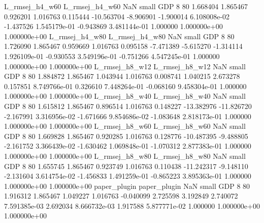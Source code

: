 L_rmsej_h4_w60 L_rmsej_h4_w60                   NaN      small      GDP                 8 80 1.668404       1.865467 0.926201       1.016763    0.115444    -10.563704     -8.906901    -1.900014   6.108008e-02 -1.437526 1.545179e-01    -0.943869   3.481144e-01            1.000000    1.000000e+00        1.000000e+00
L_rmsej_h4_w80 L_rmsej_h4_w80                   NaN      small      GDP                 8 80 1.726090       1.865467 0.959669       1.016763    0.095158     -7.471389     -5.615270    -1.314114   1.926109e-01 -0.930553 3.549196e-01    -0.751266   4.547245e-01            1.000000    1.000000e+00        1.000000e+00
L_rmsej_h8_w12 L_rmsej_h8_w12                   NaN      small      GDP                 8 80 1.884872       1.865467 1.043944       1.016763    0.008741      1.040215      2.673278     0.157851   8.749766e-01  0.326610 7.448264e-01    -0.068160   9.458304e-01            1.000000    1.000000e+00        1.000000e+00
L_rmsej_h8_w40 L_rmsej_h8_w40                   NaN      small      GDP                 8 80 1.615812       1.865467 0.896514       1.016763    0.148227    -13.382976    -11.826720    -2.167991   3.316956e-02 -1.671666 9.854686e-02    -1.083648   2.818173e-01            1.000000    1.000000e+00        1.000000e+00
L_rmsej_h8_w60 L_rmsej_h8_w60                   NaN      small      GDP                 8 80 1.669828       1.865467 0.920285       1.016763    0.128776    -10.487395     -9.488805    -2.161752   3.366439e-02 -1.630462 1.069848e-01    -1.070312   2.877383e-01            1.000000    1.000000e+00        1.000000e+00
L_rmsej_h8_w80 L_rmsej_h8_w80                   NaN      small      GDP                 8 80 1.655745       1.865467 0.923749       1.016763    0.110438    -11.242317     -9.148110    -2.131604   3.614754e-02 -1.456833 1.491259e-01    -0.865223   3.895363e-01            1.000000    1.000000e+00        1.000000e+00
  paper_plugin   paper_plugin                   NaN      small      GDP                 8 80 1.916312       1.865467 1.049227       1.016763   -0.040099      2.725598      3.192849     2.740072   7.591385e-03  2.692034 8.666732e-03     1.917588   5.877771e-02            1.000000    1.000000e+00        1.000000e+00